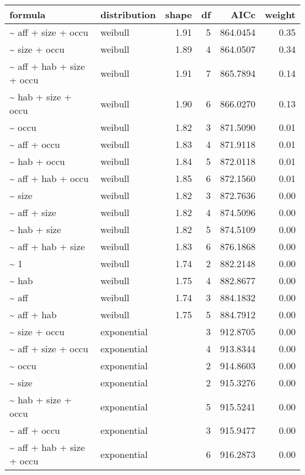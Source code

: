 \begin{table}[ht]
\centering
\begin{tabular}{llrrrr}
 formula & distribution & shape & df & AICc & weight \\ 
  \hline
\~{} aff + size + occu & weibull & 1.91 & 5 & 864.0454 & 0.35 \\ 
  \~{} size + occu & weibull & 1.89 & 4 & 864.0507 & 0.34 \\ 
  \~{} aff + hab + size + occu & weibull & 1.91 & 7 & 865.7894 & 0.14 \\ 
  \~{} hab + size + occu & weibull & 1.90 & 6 & 866.0270 & 0.13 \\ 
  \~{} occu & weibull & 1.82 & 3 & 871.5090 & 0.01 \\ 
  \~{} aff + occu & weibull & 1.83 & 4 & 871.9118 & 0.01 \\ 
  \~{} hab + occu & weibull & 1.84 & 5 & 872.0118 & 0.01 \\ 
  \~{} aff + hab + occu & weibull & 1.85 & 6 & 872.1560 & 0.01 \\ 
  \~{} size & weibull & 1.82 & 3 & 872.7636 & 0.00 \\ 
  \~{} aff + size & weibull & 1.82 & 4 & 874.5096 & 0.00 \\ 
  \~{} hab + size & weibull & 1.82 & 5 & 874.5109 & 0.00 \\ 
  \~{} aff + hab + size & weibull & 1.83 & 6 & 876.1868 & 0.00 \\ 
  \~{} 1 & weibull & 1.74 & 2 & 882.2148 & 0.00 \\ 
  \~{} hab & weibull & 1.75 & 4 & 882.8677 & 0.00 \\ 
  \~{} aff & weibull & 1.74 & 3 & 884.1832 & 0.00 \\ 
  \~{} aff + hab & weibull & 1.75 & 5 & 884.7912 & 0.00 \\ 
  \~{} size + occu & exponential &  & 3 & 912.8705 & 0.00 \\ 
  \~{} aff + size + occu & exponential &  & 4 & 913.8344 & 0.00 \\ 
  \~{} occu & exponential &  & 2 & 914.8603 & 0.00 \\ 
  \~{} size & exponential &  & 2 & 915.3276 & 0.00 \\ 
  \~{} hab + size + occu & exponential &  & 5 & 915.5241 & 0.00 \\ 
  \~{} aff + occu & exponential &  & 3 & 915.9477 & 0.00 \\ 
  \~{} aff + hab + size + occu & exponential &  & 6 & 916.2873 & 0.00 \\ 

\end{tabular}
\end{table}
